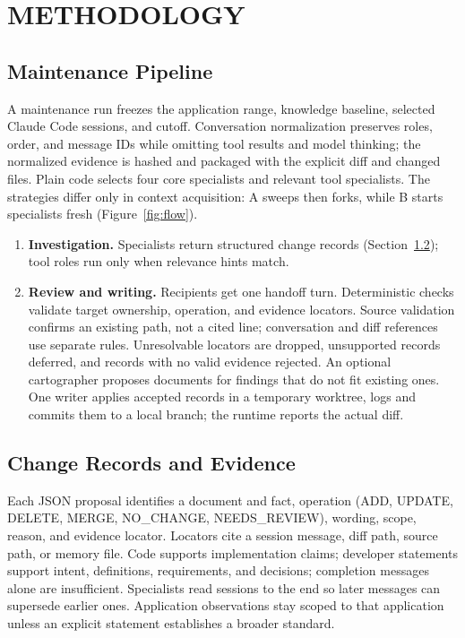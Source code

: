 \chapter{METHODOLOGY}
\label{ch:method}

\section{Maintenance Pipeline}

A maintenance run freezes the application range, knowledge baseline, selected Claude Code sessions, and cutoff. Conversation normalization preserves roles, order, and message IDs while omitting tool results and model thinking; the normalized evidence is hashed and packaged with the explicit diff and changed files. Plain code selects four core specialists and relevant tool specialists. The strategies differ only in context acquisition: A sweeps then forks, while B starts specialists fresh (Figure~\ref{fig:flow}).
\begin{enumerate}[nosep]
  \item \textbf{Investigation.} Specialists return structured change records (Section~\ref{sec:record}); tool roles run only when relevance hints match.
  \item \textbf{Review and writing.} Recipients get one handoff turn. Deterministic checks validate target ownership, operation, and evidence locators. Source validation confirms an existing path, not a cited line; conversation and diff references use separate rules. Unresolvable locators are dropped, unsupported records deferred, and records with no valid evidence rejected. An optional cartographer proposes documents for findings that do not fit existing ones. One writer applies accepted records in a temporary worktree, logs and commits them to a local branch; the runtime reports the actual diff.
\end{enumerate}

\section{Change Records and Evidence}
\label{sec:record}

Each JSON proposal identifies a document and fact, operation (ADD, UPDATE, DELETE, MERGE, NO\_CHANGE, NEEDS\_REVIEW), wording, scope, reason, and evidence locator. Locators cite a session message, diff path, source path, or memory file. Code supports implementation claims; developer statements support intent, definitions, requirements, and decisions; completion messages alone are insufficient. Specialists read sessions to the end so later messages can supersede earlier ones. Application observations stay scoped to that application unless an explicit statement establishes a broader standard.

